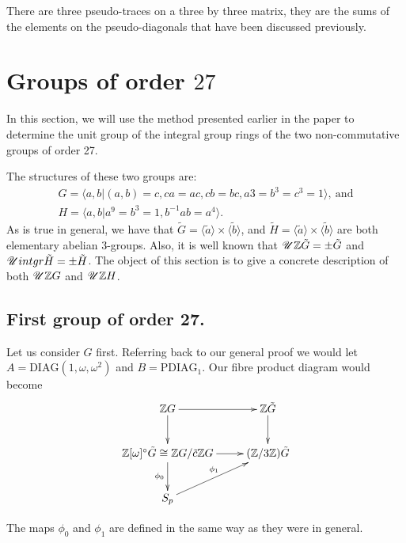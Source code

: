 \documentclass[11pt]{report}
\begin{document}
There are three pseudo-traces on a three by three matrix, they 
are the sums of the
elements on the pseudo-diagonals that have been discussed 
previously.
\chapter{Groups of order $27$}
In this section, we will use the method presented earlier in the 
paper to determine the unit
group of the integral group rings of the two non-commutative 
groups of order 27.

The structures of these two groups are:
\begin{align*}
G = \langle a,b | (a,b) = c, ca = ac, cb = bc, a3 = b^3 = c^3 = 1\rangle,\mathrm{\ and}\\
H = \langle a,b | a^9 = b^3 = 1, b^{-1}ab = a^4\rangle.
\end{align*}
As is true in general, we have that  
$\widetilde{G} = \langle\tilde{a}\rangle\times\langle\tilde{b}\rangle$, and 
$\widetilde{H} = \langle\tilde{a}\rangle\times\langle\tilde{b}\rangle$ 
are both
elementary abelian 3-groups. Also, it is well known that
 $\mathscr{U}{ \mathbb{Z}\tilde{G}} = \pm \tilde{G}$ 
and $\mathscr{U}{intgr{\tilde{H}}} = \pm \tilde{H}$. The
object of this section is to give a concrete description of both 
$\mathscr{U}{ \mathbb{Z}G}$ and $\mathscr{U}{ \mathbb{Z}H}$.
\section{First group of order 27.}
Let us consider $G$ first. Referring back to our general proof we 
would let
$A=\mathrm{DIAG}(1,\omega,\omega^2)$ and $B = \mathrm{PDIAG}_1$. 
Our fibre product diagram would become
\[
\xymatrix{
\intG \ar[r] \ar[d] &
\intgr{\tilde{G}}  \ar[d] \\
\intgrgen{\omega}^\circ\tilde{G}\cong\intG/\tilde{c}\intG \ar[r] \ar[d]_{\phi_0} &
(\integers/3\integers)\tilde{G} \\
S_p \ar[ur]^{\phi_1}\\
}
\]

The maps $\phi_0$ and $\phi_1$ are defined in the same way as 
they were in general.
\end{document}
